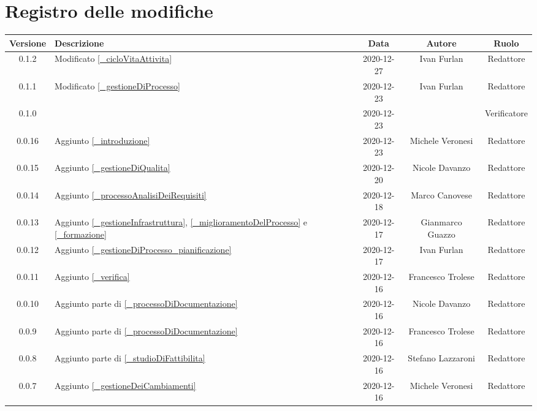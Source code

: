 \section*{Registro delle modifiche}

\begin{center}
	\begin{longtable}{|c|p{5cm}|c|c|c|}
		\hline
		\rowcolor{lighter-grayer}
		\textbf{Versione} & \textbf{Descrizione} & \textbf{Data} & \textbf{Autore} & \textbf{Ruolo} \\
		\hline
		\endfirsthead


		0.1.2 & Modificato \ref{_cicloVitaAttivita} & 2020-12-27& Ivan Furlan & Redattore \\
		0.1.1 & Modificato \ref{_gestioneDiProcesso} & 2020-12-23 & Ivan Furlan & Redattore \\
		0.1.0 &  & 2020-12-23 &  & Verificatore \\
		0.0.16 & Aggiunto \ref{_introduzione} & 2020-12-23 & Michele Veronesi & Redattore \\
		0.0.15 & Aggiunto \ref{_gestioneDiQualita} & 2020-12-20 & Nicole Davanzo & Redattore \\
		0.0.14 & Aggiunto \ref{_processoAnalisiDeiRequisiti} & 2020-12-18 & Marco Canovese & Redattore \\
		0.0.13 & Aggiunto \ref{_gestioneInfrastruttura}, \ref{_miglioramentoDelProcesso} e \ref{_formazione} & 2020-12-17 & Gianmarco Guazzo & Redattore \\
		0.0.12 & Aggiunto \ref{_gestioneDiProcesso_pianificazione} & 2020-12-17 & Ivan Furlan & Redattore \\
		0.0.11 & Aggiunto \ref{_verifica} & 2020-12-16 & Francesco Trolese & Redattore \\
		0.0.10 & Aggiunto parte di \ref{_processoDiDocumentazione} & 2020-12-16 & Nicole Davanzo & Redattore \\
		0.0.9 & Aggiunto parte di \ref{_processoDiDocumentazione} & 2020-12-16 & Francesco Trolese & Redattore \\
		0.0.8 & Aggiunto parte di \ref{_studioDiFattibilita} & 2020-12-16 & Stefano Lazzaroni & Redattore \\
		0.0.7 & Aggiunto \ref{_gestioneDeiCambiamenti} & 2020-12-16 & Michele Veronesi & Redattore \\

\end{longtable}
\end{center}
